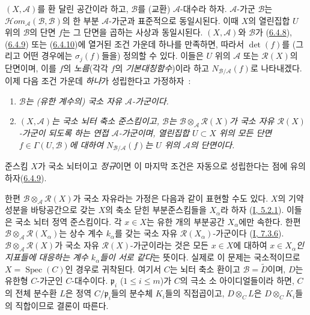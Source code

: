\begin{env}[6.5.1]
\label{II.6.5.1-ko}
$(X,\mathcal{A})$를 환 달린 공간이라 하고, $\mathcal{B}$를 (교환)
$\mathcal{A}$-대수라 하자. $\mathcal{A}$-가군 $\mathcal{B}$는
$\mathcal{H}om_{\mathcal{A}}(\mathcal{B},\mathcal{B})$의 한 부분
$\mathcal{A}$-가군과 표준적으로 동일시된다. 이때 $X$의 열린집합 $U$
위의 $\mathcal{B}$의 단면 $f$는 그 단면을 곱하는 사상과 동일시된다.
$(X,\mathcal{A})$와 $\mathcal{B}$가
(\hyperref[II.6.4.8-ko]{6.4.8}), (\hyperref[II.6.4.9-ko]{6.4.9}) 또는
(\hyperref[II.6.4.10-ko]{6.4.10})에 열거된 조건 가운데 하나를
만족하면, 따라서 $\det(f)$를 (그리고 어떤 경우에는 $\sigma_j(f)$들을)
정의할 수 있다. 이들은 $U$ 위의 $\mathcal{A}$ 또는
$\mathcal{R}(X)$의 단면이며, 이를 $f$의 \emph{노름}(각각 $f$의
\emph{기본대칭함수})이라 하고 $N_{\mathcal{B}/\mathcal{A}}(f)$로
나타내겠다. 이제 다음 조건 가운데 \emph{하나}가 성립한다고 가정하자~:
\begin{enumerate}
\item[(I)] \emph{$\mathcal{B}$는 (유한 계수의) 국소 자유
$\mathcal{A}$-가군이다.}
\item[(II)] \emph{$(X,\mathcal{A})$는 국소 뇌터 축소 준스킴이고,
$\mathcal{B}$는 $\mathcal{B}\otimes_{\mathcal{A}}\mathcal{R}(X)$가
국소 자유 $\mathcal{R}(X)$-가군이 되도록 하는 연접
$\mathcal{A}$-가군이며, 열린집합 $U\subset X$ 위의 모든 단면
$f\in\Gamma(U,\mathcal{B})$에 대하여
$N_{\mathcal{B}/\mathcal{A}}(f)$는 $U$ 위의 $\mathcal{A}$의 단면이다.}
\end{enumerate}


준스킴 $X$가 국소 뇌터이고 \emph{정규}이면 이 마지막 조건은 자동으로
성립한다는 점에 유의하자(\hyperref[II.6.4.9-ko]{6.4.9}).

한편 $\mathcal{B}\otimes_{\mathcal{A}}\mathcal{R}(X)$가 국소 자유라는
가정은 다음과 같이 표현할 수도 있다. $X$의 기약 성분을 바탕공간으로
갖는 $X$의 축소 닫힌 부분준스킴들을 $X_\alpha$라 하자
(\hyperref[I.5.2.1-ko]{I, 5.2.1}). 이들은 국소 뇌터 정역 준스킴이다.
각 $x\in X$는 유한 개의 부분공간 $X_\alpha$에만 속한다. 한편
$\mathcal{B}\otimes_{\mathcal{A}}\mathcal{R}(X_\alpha)$는 상수 계수
$k_\alpha$를 갖는 국소 자유 $\mathcal{R}(X_\alpha)$-가군이다
(\hyperref[I.7.3.6-ko]{I, 7.3.6}).
$\mathcal{B}\otimes_{\mathcal{A}}\mathcal{R}(X)$가 국소 자유
$\mathcal{R}(X)$-가군이라는 것은 모든 $x\in X$에 대하여
\emph{$x\in X_\alpha$인 지표들에 대응하는 계수 $k_\alpha$들이
서로 같다}는 뜻이다. 실제로 이 문제는 국소적이므로
$X=\operatorname{Spec}(C)$인 경우로 귀착된다. 여기서 $C$는 뇌터 축소
환이고 $\mathcal{B}=\widetilde{D}$이며, $D$는 유한형 $C$-가군인
$C$-대수이다. $\mathfrak{p}_i$ ($1\leq i\leq m$)가 $C$의 극소 소
아이디얼들이라 하면, $C$의 전체 분수환 $L$은 정역
$C/\mathfrak{p}_i$들의 분수체 $K_i$들의 직접곱이고,
$D\otimes_C L$은 $D\otimes_C K_i$들의 직합이므로 결론이 따른다.


\end{env}
